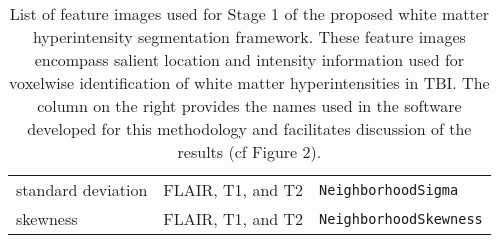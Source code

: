 \begin{table}[!htb]
\begin{tabular*}{1.0\textwidth}{@{\extracolsep{\fill}} lll}
    standard deviation & FLAIR, T1, and T2  & \texttt{NeighborhoodSigma}\\
    skewness & FLAIR, T1, and T2  & \texttt{NeighborhoodSkewness}\\
    \midrule
    \bottomrule
  \end{tabular*}
 \label{table:indices}
 \caption{List of feature images used for Stage 1 of the proposed white matter
          hyperintensity segmentation framework.  These feature images encompass
          salient location and intensity information used for voxelwise identification
          of white matter hyperintensities in TBI.  The column on the right provides
          the names used in the software developed for this methodology and
          facilitates discussion of the results (cf Figure 2).
          }
\end{table}


